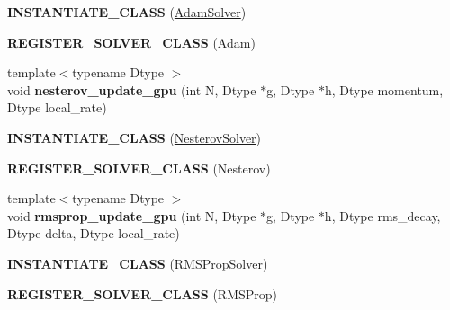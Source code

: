 \begin{DoxyCompactItemize}
\item 
{\bfseries I\+N\+S\+T\+A\+N\+T\+I\+A\+T\+E\+\_\+\+C\+L\+A\+SS} (\hyperlink{classcaffe_1_1AdamSolver}{Adam\+Solver})\hypertarget{namespacecaffe_af4ddedfd2728d0c2fdceb68ee4f394fa}{}\label{namespacecaffe_af4ddedfd2728d0c2fdceb68ee4f394fa}

\item 
{\bfseries R\+E\+G\+I\+S\+T\+E\+R\+\_\+\+S\+O\+L\+V\+E\+R\+\_\+\+C\+L\+A\+SS} (Adam)\hypertarget{namespacecaffe_aaabbc77f8f1b832c4a1e10cb711f8650}{}\label{namespacecaffe_aaabbc77f8f1b832c4a1e10cb711f8650}

\item 
{\footnotesize template$<$typename Dtype $>$ }\\void {\bfseries nesterov\+\_\+update\+\_\+gpu} (int N, Dtype $\ast$g, Dtype $\ast$h, Dtype momentum, Dtype local\+\_\+rate)\hypertarget{namespacecaffe_a98a8eff88f111dba635bdc3f6e0498b1}{}\label{namespacecaffe_a98a8eff88f111dba635bdc3f6e0498b1}

\item 
{\bfseries I\+N\+S\+T\+A\+N\+T\+I\+A\+T\+E\+\_\+\+C\+L\+A\+SS} (\hyperlink{classcaffe_1_1NesterovSolver}{Nesterov\+Solver})\hypertarget{namespacecaffe_a02cc71391faa1a585e54847dee621d3e}{}\label{namespacecaffe_a02cc71391faa1a585e54847dee621d3e}

\item 
{\bfseries R\+E\+G\+I\+S\+T\+E\+R\+\_\+\+S\+O\+L\+V\+E\+R\+\_\+\+C\+L\+A\+SS} (Nesterov)\hypertarget{namespacecaffe_afd512384c2b9ee0431403c8fb678314a}{}\label{namespacecaffe_afd512384c2b9ee0431403c8fb678314a}

\item 
{\footnotesize template$<$typename Dtype $>$ }\\void {\bfseries rmsprop\+\_\+update\+\_\+gpu} (int N, Dtype $\ast$g, Dtype $\ast$h, Dtype rms\+\_\+decay, Dtype delta, Dtype local\+\_\+rate)\hypertarget{namespacecaffe_a39053f2a38c1044610a95c4d43588540}{}\label{namespacecaffe_a39053f2a38c1044610a95c4d43588540}

\item 
{\bfseries I\+N\+S\+T\+A\+N\+T\+I\+A\+T\+E\+\_\+\+C\+L\+A\+SS} (\hyperlink{classcaffe_1_1RMSPropSolver}{R\+M\+S\+Prop\+Solver})\hypertarget{namespacecaffe_afbfed44d531472cf6f362c9b6b8b806e}{}\label{namespacecaffe_afbfed44d531472cf6f362c9b6b8b806e}

\item 
{\bfseries R\+E\+G\+I\+S\+T\+E\+R\+\_\+\+S\+O\+L\+V\+E\+R\+\_\+\+C\+L\+A\+SS} (R\+M\+S\+Prop)\hypertarget{namespacecaffe_a06c041d02b37d5ba5345957b0654ae10}{}\label{namespacecaffe_a06c041d02b37d5ba5345957b0654ae10}


\end{DoxyCompactItemize}
